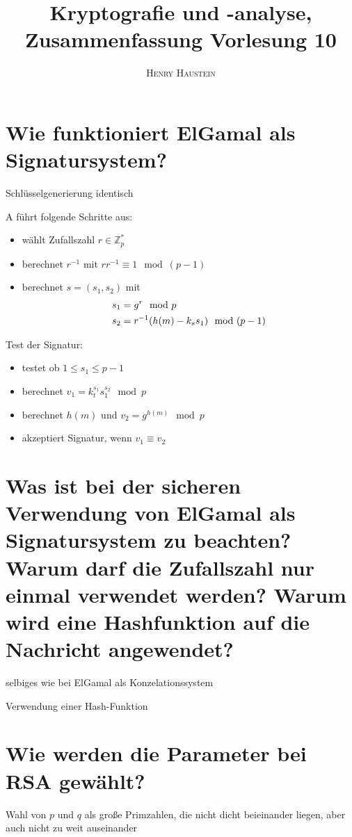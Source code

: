 \documentclass{article}
\title{\textbf{Kryptografie und -analyse, Zusammenfassung Vorlesung 10}}
\author{\textsc{Henry Haustein}}
\date{}
\begin{document}
	\maketitle
	
	\section*{Wie funktioniert ElGamal als Signatursystem?}
	Schlüsselgenerierung identisch
	
	A führt folgende Schritte aus:
	\begin{itemize}
		\item wählt Zufallszahl $r\in\mathbb{Z}_p^\ast$
		\item berechnet $r^{-1}$ mit $rr^{-1} \equiv 1 \mod (p-1)$
		\item berechnet $s=(s_1,s_2)$ mit
		\begin{align}
			s_1 &= g^r\mod p \notag \\
			s_2 &= r^{-1}(h(m) - k_ss_1) \mod (p-1) \notag
		\end{align}
	\end{itemize}

	Test der Signatur:
	\begin{itemize}
		\item testet ob $1\le s_1\le p-1$
		\item berechnet $v_1 = k_t^{s_1}s_1^{s_2} \mod p$
		\item berechnet $h(m)$ und $v_2 = g^{h(m)}\mod p$
		\item akzeptiert Signatur, wenn $v_1 \equiv v_2$
	\end{itemize}
	
	\section*{Was ist bei der sicheren Verwendung von ElGamal als Signatursystem zu beachten? Warum darf die Zufallszahl nur einmal verwendet werden? Warum wird eine Hashfunktion auf die Nachricht angewendet?}
	selbiges wie bei ElGamal als Konzelationssystem
	
	Verwendung einer Hash-Funktion
	
	\section*{Wie werden die Parameter bei RSA gewählt?}
	Wahl von $p$ und $q$ als große Primzahlen, die nicht dicht beieinander liegen, aber auch nicht zu weit auseinander
	
\end{document}
